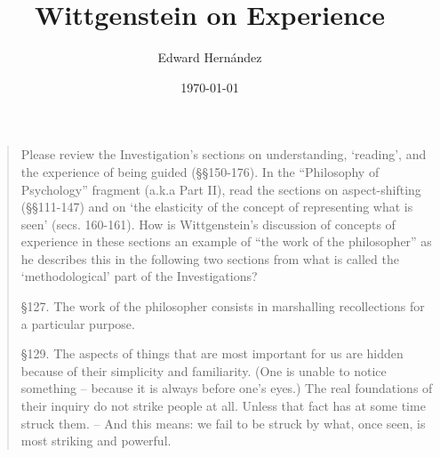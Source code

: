 \documentclass[doc,12pt,apacite,biblatex]{apa6}
\begin{document}
\title{Wittgenstein on Experience}
\author{Edward Hern\'{a}ndez}
\date{\today}

\maketitle

\vspace{-20pt}
\begin{quote}
	Please review the Investigation's sections on understanding, `reading', and
	the experience of being guided (\S\S 150-176). In the ``Philosophy of
	Psychology'' fragment (a.k.a Part II), read the sections on aspect-shifting
	(\S\S 111-147) and on `the elasticity of the concept of representing what
	is seen' (secs. 160-161).  How is Wittgenstein's discussion of concepts of
	experience in these sections an example of ``the work of the philosopher''
	as he describes this in the following two sections from what is called the
	`methodological' part of the Investigations?

	\S 127. The work of the philosopher consists in marshalling recollections
	for a particular purpose.

	\S 129. The aspects of things that are most important for us are hidden
	because of their simplicity and familiarity. (One is unable to notice
	something  -- because it is always before one's eyes.) The real foundations
	of their inquiry do not strike people at all. Unless that fact has at some
	time struck them. -- And this means: we fail to be struck by what, once
	seen, is most striking and powerful.
\end{quote}
\clearpage


\nocite{Wittgenstein53}

\clearpage


\end{document}
